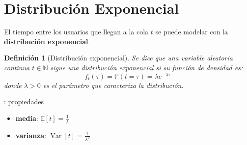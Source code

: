 \documentclass[xcolor={x11names}]{beamer}
\DeclareMathOperator{\Var}{Var}
\newtheorem{definicion}{Definición}[section]
\newcommand{\blue}[1]{{\color{blue}#1}}
\begin{document}
\section{Distribución Exponencial}

\begin{frame}{\secname}
    \begin{figure}
        
    \end{figure}
    El tiempo entre los usuarios que
    llegan a la cola \blue{$t$} se puede
    modelar con la \textbf{distribución exponencial}.
\end{frame}



\begin{frame}{\secname}
    \begin{definicion}[Distribución exponencial]
        Se dice que una variable aleatoria
        continua $t\in\mathbb{N}$ sigue una
        distribución exponencial si su
        función de densidad es:
        \begin{equation}
            f_t(\tau) = \mathbb{P}(t=\tau) = \lambda e^{-\lambda \tau}
        \end{equation}
        donde $\lambda>0$ es el parámetro
        que caracteriza la distribución.
    \end{definicion}
\end{frame}




\begin{frame}{\secname: propiedades}
    \begin{figure}
        
    \end{figure}


    \begin{itemize}
        \item \textbf{media}: $\mathbb{E}[t]=\tfrac{1}{\lambda}$
        \item \textbf{varianza}: $\Var[t]=\tfrac{1}{\lambda^2}$
    \end{itemize}
\end{frame}
\end{document}

